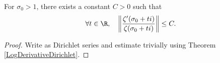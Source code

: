 \begin{lemma}
\label{dlog_riemannZeta_bdd_on_vertical_lines}
\leanok
For $\sigma_0 > 1$, there exists a constant $C > 0$ such that
  $$
  \forall t \in \R, \quad
  \left\| \frac{\zeta'(\sigma_0 + t i)}{\zeta(\sigma_0 + t i)} \right\| \leq C.
  $$
\end{lemma}
\begin{proof}
\leanok
Write as Dirichlet series and estimate trivially using Theorem \ref{LogDerivativeDirichlet}.
\end{proof}
